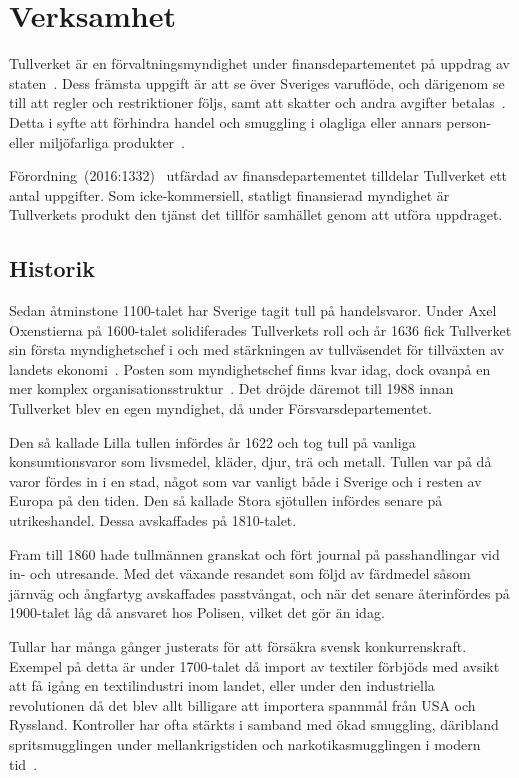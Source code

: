 \section{Verksamhet}

Tullverket är en förvaltningsmyndighet under finansdepartementet på
uppdrag av staten~\cite{styrning}. Dess främsta uppgift är att se över Sveriges
varuflöde, och därigenom se till att regler och restriktioner följs, samt att
skatter och andra avgifter betalas~\cite{verksamhet}. Detta i syfte att
förhindra handel och smuggling i olagliga eller annars person- eller
miljöfarliga produkter~\cite{wikipedia}.

Förordning~(2016:1332)~\cite{forordning} utfärdad av finansdepartementet
tilldelar Tullverket ett antal uppgifter. Som icke-kommersiell, statligt
finansierad myndighet är Tullverkets produkt den tjänst det tillför samhället
genom att utföra uppdraget.

\subsection{Historik}

Sedan åtminstone 1100-talet har Sverige tagit tull på handelsvaror. Under
Axel Oxenstierna på 1600-talet solidiferades Tullverkets roll och år 1636
fick Tullverket sin första myndighetschef i och med stärkningen av tullväsendet
för tillväxten av landets ekonomi~\cite{wikipedia}. Posten som myndighetschef
finns kvar idag, dock ovanpå en mer komplex
organisationsstruktur~\cite{forordning}. Det dröjde däremot till 1988 innan
Tullverket blev en egen myndighet, då under Försvarsdepartementet.

Den så kallade Lilla tullen infördes år 1622 och tog tull på vanliga
konsumtionsvaror som livsmedel, kläder, djur, trä och metall. Tullen var på
då varor fördes in i en stad, något som var vanligt både i Sverige och i resten
av Europa på den tiden. Den så kallade Stora sjötullen infördes senare på
utrikeshandel. Dessa avskaffades på 1810-talet.

Fram till 1860 hade tullmännen granskat och fört journal på passhandlingar vid
in- och utresande. Med det växande resandet som följd av färdmedel såsom
järnväg och ångfartyg avskaffades passtvångat, och när det senare återinfördes
på 1900-talet låg då ansvaret hos Polisen, vilket det gör än idag.

Tullar har många gånger justerats för att försäkra svensk konkurrenskraft.
Exempel på detta är under 1700-talet då import av textiler förbjöds med avsikt
att få igång en textilindustri inom landet, eller under den industriella
revolutionen då det blev allt billigare att importera spannmål från USA
och Ryssland.
%
Kontroller har ofta stärkts i samband med ökad smuggling, däribland
spritsmugglingen under mellankrigstiden och narkotikasmugglingen i modern
tid~\cite{historik}.

